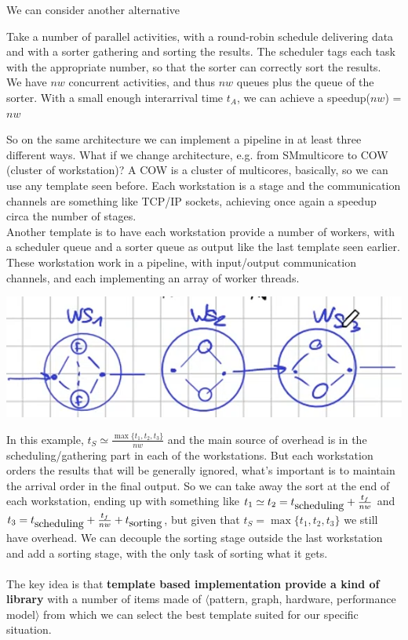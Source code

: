 \documentclass[10pt]{report}
\begin{document}
We can consider another alternative
\begin{list}{}{}
	\item Take a number of parallel activities, with a round-robin schedule delivering data and with a sorter gathering and sorting the results. The scheduler tags each task with the appropriate number, so that the sorter can correctly sort the results.\\
	We have $nw$ concurrent activities, and thus $nw$ queues plus the queue of the sorter. With a small enough interarrival time $t_A$, we can achieve a speedup($nw$) = $nw$
\end{list}
So on the same architecture we can implement a pipeline in at least three different ways. What if we change architecture, e.g. from SMmulticore to COW (cluster of workstation)? A COW is a cluster of multicores, basically, so we can use any template seen before. Each workstation is a stage and the communication channels are something like TCP/IP sockets, achieving once again a speedup circa the number of stages.\\
Another template is to have each workstation provide a number of workers, with a scheduler queue and a sorter queue as output like the last template seen earlier. These workstation work in a pipeline, with input/output communication channels, and each implementing an array of worker threads.
\begin{center}
	\includegraphics[scale=0.5]{27.png}
\end{center}
In this example, $t_S\simeq\frac{\max\{t_1,t_2,t_3\}}{nw}$ and the main source of overhead is in the scheduling/gathering part in each of the workstations. But each workstation orders the results that will be generally ignored, what's important is to maintain the arrival order in the final output. So we can take away the sort at the end of each workstation, ending up with something like $t_1\simeq t_2 = t_{\hbox{scheduling}} + \frac{t_f}{nw}$ and $t_3 = t_{\hbox{scheduling}} + \frac{t_f}{nw} + t_{\hbox{sorting}}$, but given that $t_S=\max\{t_1, t_2, t_3\}$ we still have overhead. We can decouple the sorting stage outside the last workstation and add a sorting stage, with the only task of sorting what it gets.\\\\
The key idea is that \textbf{template based implementation provide a kind of library} with a number of items made of $\langle$pattern, graph, hardware, performance model$\rangle$ from which we can select the best template suited for our specific situation.
\end{document}
